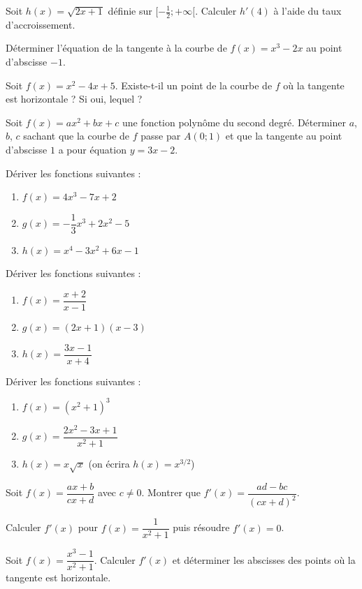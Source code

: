 \exo{}
Soit $h(x)=\sqrt{2x+1}$ définie sur $[-\frac12;+\infty[$. Calculer $h'(4)$ à l'aide du taux d'accroissement.

\exo{}
Déterminer l'équation de la tangente à la courbe de $f(x)=x^3-2x$ au point d'abscisse $-1$.

\exo{}
Soit $f(x)=x^2-4x+5$. Existe-t-il un point de la courbe de $f$ où la tangente est horizontale ? Si oui, lequel ?

\exo{}
Soit $f(x)=ax^2+bx+c$ une fonction polynôme du second degré. Déterminer $a$, $b$, $c$ sachant que la courbe de $f$ passe par $A(0;1)$ et que la tangente au point d'abscisse $1$ a pour équation $y=3x-2$.


\exo{}
Dériver les fonctions suivantes :
\begin{enumerate}[label=\alph*)]
\item $f(x)=4x^3-7x+2$
\item $g(x)=-\dfrac13x^3+2x^2-5$
\item $h(x)=x^4-3x^2+6x-1$
\end{enumerate}

\exo{}
Dériver les fonctions suivantes :
\begin{enumerate}[label=\alph*)]
\item $f(x)=\dfrac{x+2}{x-1}$
\item $g(x)=(2x+1)(x-3)$
\item $h(x)=\dfrac{3x-1}{x+4}$
\end{enumerate}

\exo{}
Dériver les fonctions suivantes :
\begin{enumerate}[label=\alph*)]
\item $f(x)=(x^2+1)^3$
\item $g(x)=\dfrac{2x^2-3x+1}{x^2+1}$
\item $h(x)=x\sqrt{x}$ (on écrira $h(x)=x^{3/2}$)
\end{enumerate}

\exo{}
Soit $f(x)=\dfrac{ax+b}{cx+d}$ avec $c\neq0$. Montrer que $f'(x)=\dfrac{ad-bc}{(cx+d)^2}$.

\exo{}
Calculer $f'(x)$ pour $f(x)=\dfrac{1}{x^2+1}$ puis résoudre $f'(x)=0$.

\exo{}
Soit $f(x)=\dfrac{x^3-1}{x^2+1}$. Calculer $f'(x)$ et déterminer les abscisses des points où la tangente est horizontale.


